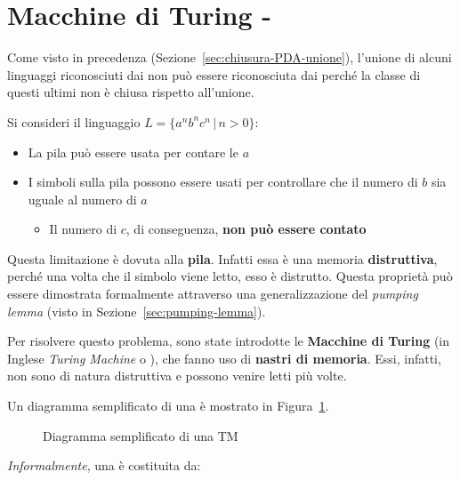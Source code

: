 \documentclass[italian, 10pt]{article}
\begin{document}
\section{Macchine di Turing - \TM}

Come visto in precedenza (Sezione~\ref{sec:chiusura-PDA-unione}), l'unione di alcuni linguaggi riconosciuti dai \PDA non può essere riconosciuta dai \PDA perché la classe di questi ultimi non è chiusa rispetto all'unione.

\bigskip

Si consideri il linguaggio \(L = \{a^n b^n c^n \, | \, n > 0\}\):

\begin{itemize}
  \item La pila può essere usata per contare le \(a\)
  \item I simboli sulla pila possono essere usati per controllare che il numero di \(b\) sia uguale al numero di \(a\)
        \begin{itemize}
          \item[\xmark] Il numero di \(c\), di conseguenza, \textbf{non può essere contato}
        \end{itemize}
\end{itemize}

Questa limitazione è dovuta alla \textbf{pila}.
Infatti essa è una memoria \textbf{distruttiva}, perché una volta che il simbolo viene letto, esso è distrutto.
Questa proprietà può essere dimostrata formalmente attraverso una generalizzazione del \textit{pumping lemma} (visto in Sezione~\ref{sec:pumping-lemma}).

Per risolvere questo problema, sono state introdotte le \textbf{Macchine di Turing} (in Inglese \textit{Turing Machine} o \TM), che fanno uso di \textbf{nastri di memoria}.
Essi, infatti, non sono di natura distruttiva e possono venire letti più volte.

\bigskip
Un diagramma semplificato di una \TM è mostrato in Figura~\ref{fig:diagramma-TM}.

\begin{figure}[htbp]
  \bigskip
  \centering
  \caption{Diagramma semplificato di una TM}
  \label{fig:diagramma-TM}
  \bigskip
\end{figure}

\textit{Informalmente}, una \TM è costituita da:
\end{document}
